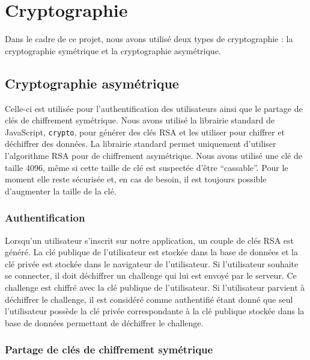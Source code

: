 \documentclass[
  11pt,
  paper=a4,
  ,captions=tableheading
]{scrartcl}
\begin{document}
\hypertarget{cryptographie}{%
\section{Cryptographie}\label{cryptographie}}

Dans le cadre de ce projet, nous avons utilisé deux types de
cryptographie : la cryptographie symétrique et la cryptographie
asymétrique.

\hypertarget{cryptographie-asymuxe9trique}{%
\subsection{Cryptographie
asymétrique}\label{cryptographie-asymuxe9trique}}

Celle-ci est utilisée pour l’authentification des utilisateurs ainsi que
le partage de clés de chiffrement symétrique. Nous avons utilisé la
librairie standard de JavaScript, \texttt{crypto}, pour générer
des clés RSA et les utiliser pour chiffrer et déchiffrer des données. La
librairie standard permet uniquement d’utiliser l’algorithme RSA pour de
chiffrement asymétrique. Nous avons utilisé une clé de taille 4096, même
si cette taille de clé est suspectée d’être “cassable”. Pour le moment
elle reste sécurisée et, en cas de besoin, il est toujours possible
d’augmenter la taille de la clé.

\hypertarget{authentification}{%
\subsubsection{Authentification}\label{authentification}}

Lorsqu’un utilisateur s’inscrit sur notre application, un couple de clés
RSA est généré. La clé publique de l’utilisateur est stockée dans la
base de données et la clé privée est stockée dans le navigateur de
l’utilisateur. Si l’utilisateur souhaite se connecter, il doit
déchiffrer un challenge qui lui est envoyé par le serveur. Ce challenge
est chiffré avec la clé publique de l’utilisateur. Si l’utilisateur
parvient à déchiffrer le challenge, il est considéré comme authentifié
étant donné que seul l’utilisateur possède la clé privée correspondante
à la clé publique stockée dans la base de données permettant de
déchiffrer le challenge.

\hypertarget{partage-de-cluxe9s-de-chiffrement-symuxe9trique}{%
\subsubsection{Partage de clés de chiffrement
symétrique}\label{partage-de-cluxe9s-de-chiffrement-symuxe9trique}}
\end{document}
